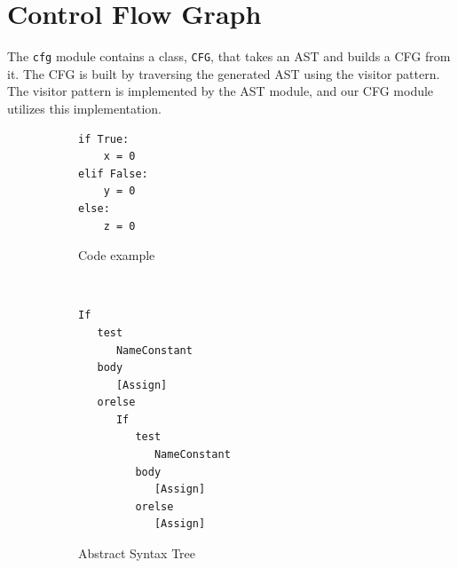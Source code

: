 \section{Control Flow Graph}
The \texttt{cfg} module contains a class, \texttt{CFG}, that takes an AST and builds a CFG from it.
The CFG is built by traversing the generated AST using the visitor pattern.\cite{design_patterns}
The visitor pattern is implemented by the AST module, and our CFG module utilizes this implementation.

\begin{figure}[H]
  \begin{subfigure}[b]{0.2\textwidth}
    \begin{lstlisting}[style=python]
if True:
    x = 0
elif False:
    y = 0
else:
    z = 0
    \end{lstlisting}
    \caption{Code example}
    \label{CFG_if_code}
  \end{subfigure}
  ~~~ %
  \begin{subfigure}[b]{0.4\textwidth}
    \begin{lstlisting}[style=default, basicstyle=\footnotesize, numbers=none]
If
   test
      NameConstant
   body
      [Assign]
   orelse
      If
         test
            NameConstant
         body
            [Assign]
         orelse
            [Assign]
    \end{lstlisting}
    \caption{Abstract Syntax Tree}
    \label{CFG_if_ast}
  \end{subfigure}
  ~
  \begin{subfigure}[b]{0.3\textwidth}
    \centering

\end{subfigure}
\end{figure}
